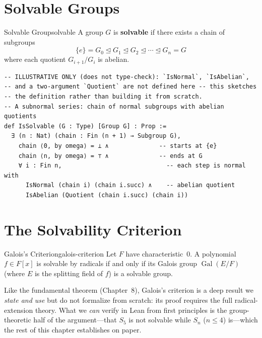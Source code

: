 \documentclass[11pt, a4paper, oneside]{book}
\newcommand{\Gal}{\operatorname{Gal}}
\newcommand{\normal}{\trianglelefteq}
\begin{document}
\section{Solvable Groups}

\begin{defn}{Solvable Group}{solvable}
A group $G$ is \textbf{solvable} if there exists a chain of subgroups
\[
  \{e\} = G_0 \normal G_1 \normal G_2 \normal \cdots \normal G_n = G
\]
where each quotient $G_{i+1}/G_i$ is abelian.
\end{defn}

\begin{leanbox}
\begin{verbatim}
-- ILLUSTRATIVE ONLY (does not type-check): `IsNormal`, `IsAbelian`,
-- and a two-argument `Quotient` are not defined here -- this sketches
-- the definition rather than building it from scratch.
-- A subnormal series: chain of normal subgroups with abelian quotients
def IsSolvable (G : Type) [Group G] : Prop :=
  ∃ (n : Nat) (chain : Fin (n + 1) → Subgroup G),
    chain ⟨0, by omega⟩ = ⊥ ∧              -- starts at {e}
    chain ⟨n, by omega⟩ = ⊤ ∧              -- ends at G
    ∀ i : Fin n,                             -- each step is normal with
      IsNormal (chain i) (chain i.succ) ∧    -- abelian quotient
      IsAbelian (Quotient (chain i.succ) (chain i))
\end{verbatim}
\end{leanbox}

\section{The Solvability Criterion}

\begin{thm}{Galois's Criterion}{galois-criterion}
Let $F$ have characteristic~$0$.
A polynomial $f \in F[x]$ is solvable by radicals if and only if its
Galois group $\Gal(E/F)$ (where $E$ is the splitting field of $f$) is a
solvable group.
\end{thm}

\begin{warning}
Like the fundamental theorem (Chapter~8), Galois's criterion is a deep result
we \emph{state and use} but do not formalize from scratch: its proof requires
the full radical-extension theory. What we \emph{can} verify in Lean from first
principles is the group-theoretic half of the argument---that $S_5$ is not
solvable while $S_n$ ($n \le 4$) is---which the rest of this chapter
establishes on paper.
\end{warning}
\end{document}
